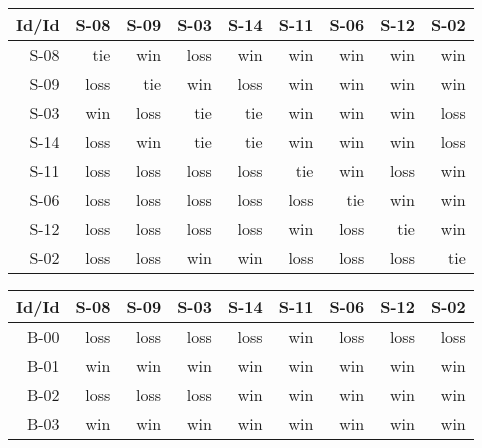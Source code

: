 \begin{tabular}{ | r | r | r | r | r | r | r | r | r | }
    \hline
        Id/Id  &   S-08  &   S-09  &   S-03  &   S-14  &   S-11  &   S-06  &   S-12  &   S-02  \\
    \hline
    \hline
         S-08  &    tie  &    win  &   loss  &    win  &    win  &    win  &    win  &    win  \\
    \hline
         S-09  &   loss  &    tie  &    win  &   loss  &    win  &    win  &    win  &    win  \\
    \hline
         S-03  &    win  &   loss  &    tie  &    tie  &    win  &    win  &    win  &   loss  \\
    \hline
         S-14  &   loss  &    win  &    tie  &    tie  &    win  &    win  &    win  &   loss  \\
    \hline
         S-11  &   loss  &   loss  &   loss  &   loss  &    tie  &    win  &   loss  &    win  \\
    \hline
         S-06  &   loss  &   loss  &   loss  &   loss  &   loss  &    tie  &    win  &    win  \\
    \hline
         S-12  &   loss  &   loss  &   loss  &   loss  &    win  &   loss  &    tie  &    win  \\
    \hline
         S-02  &   loss  &   loss  &    win  &    win  &   loss  &   loss  &   loss  &    tie  \\
    \hline
\end{tabular}


\begin{tabular}{ | r | r | r | r | r | r | r | r | r | }
    \hline
        Id/Id  &   S-08  &   S-09  &   S-03  &   S-14  &   S-11  &   S-06  &   S-12  &   S-02  \\
    \hline
    \hline
         B-00  &   loss  &   loss  &   loss  &   loss  &    win  &   loss  &   loss  &   loss  \\
    \hline
         B-01  &    win  &    win  &    win  &    win  &    win  &    win  &    win  &    win  \\
    \hline
         B-02  &   loss  &   loss  &   loss  &    win  &    win  &    win  &    win  &    win  \\
    \hline
         B-03  &    win  &    win  &    win  &    win  &    win  &    win  &    win  &    win  \\
    \hline
\end{tabular}




